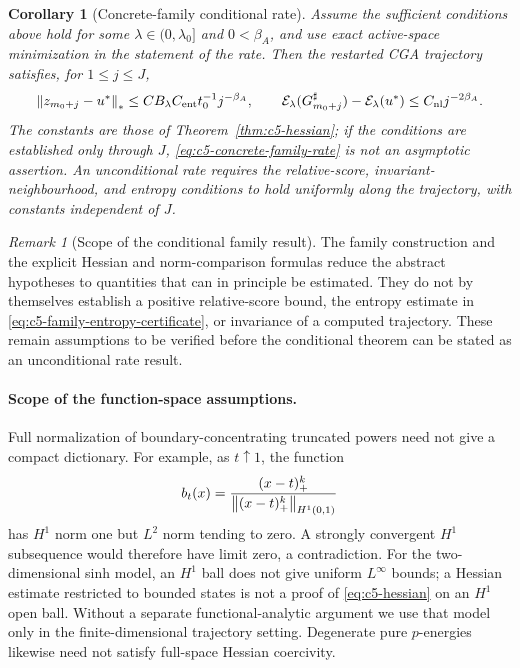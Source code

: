 \documentclass[11pt]{article}
\newtheorem{corollary}[theorem]{Corollary}
\theoremstyle{remark}
\newtheorem{remark}[theorem]{Remark}
\begin{document}
\begin{corollary}[Concrete-family conditional rate]
\label{cor:c5-concrete-family}
Assume the sufficient conditions above hold for some $\lambda\in(0,\lambda_0]$
and $0<\beta_A$, and use exact active-space minimization in the statement
of the rate.  Then the restarted CGA trajectory satisfies, for
$1\leq j\leq J$,
\begin{equation}
 \left\lVert z_{m_0+j}-u^*\right\rVert_*
   \leq C B_\lambda C_{\rm ent}t_0^{-1}j^{-\beta_A},
 \qquad
 \mathcal E_\lambda(G_{m_0+j}^\sharp)-\mathcal E_\lambda(u^*)
   \leq C_{\rm nl}j^{-2\beta_A}.
 \label{eq:c5-concrete-family-rate}
\end{equation}
The constants are those of Theorem~\ref{thm:c5-hessian}; if the conditions
are established only through $J$, \eqref{eq:c5-concrete-family-rate} is not an
asymptotic assertion. An unconditional rate requires the relative-score,
invariant-neighbourhood, and entropy conditions to hold uniformly along the trajectory,
with constants independent of $J$.
\end{corollary}

\begin{remark}[Scope of the conditional family result]
The family construction and the explicit Hessian and norm-comparison formulas reduce
the abstract hypotheses to quantities that can in principle be estimated. They do not
by themselves establish a positive relative-score bound, the entropy estimate in
\eqref{eq:c5-family-entropy-certificate}, or invariance of a computed trajectory.
These remain assumptions to be verified before the conditional theorem can be stated
as an unconditional rate result.
\end{remark}

\paragraph{Scope of the function-space assumptions.}
Full normalization of boundary-concentrating truncated powers need not
give a compact dictionary. For example, as $t\uparrow1$, the function
\[
 b_t(x)=\frac{(x-t)_+^k}{\left\lVert(x-t)_+^k\right\rVert_{H^1(0,1)}}
\]
has $H^1$ norm one
but $L^2$ norm tending to zero. A strongly convergent $H^1$ subsequence
would therefore have limit zero, a contradiction.
For the two-dimensional sinh model, an $H^1$ ball does not give
uniform $L^\infty$ bounds; a Hessian estimate restricted to bounded
states is not a proof of \eqref{eq:c5-hessian} on an $H^1$ open ball.
Without a separate functional-analytic argument we use that model only
in the finite-dimensional trajectory setting. Degenerate pure $p$-energies
likewise need not satisfy full-space Hessian coercivity.
\end{document}
